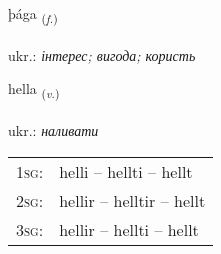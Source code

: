 \documentclass[frontgrid, backgrid]{flacards}\usepackage[]{graphicx}\usepackage[]{xcolor}
\begin{document}
\renewcommand{\flhead}{\vskip5pt \fboxsep=0pt {\small\bfseries\footnotesize Nafnorð | іменник}}
\renewcommand{\fcfoot}{\vskip5pt \fboxsep=0pt \hspace{2pt}{\small\bfseries\footnotesize 2K}}

\renewcommand{\blhead}{\vskip5pt {\small\bfseries\footnotesize Nafnorð | іменник }}
\renewcommand{\bcfoot}{\vskip5pt \hspace{2pt}{\small\bfseries\footnotesize 2K}}


{þága \small{\textsubscript{(\textit{f.})}} \\[1ex] %
\textphonetic{[θauːɣa]} \\
ukr.: \emph{інтерес; вигода; користь} \\  [2ex]
\renewcommand*{\arraystretch}{0.8}
}

\renewcommand{\flhead}{\vskip5pt \fboxsep=0pt {\small\bfseries\footnotesize Sagnorð | дієслово}}
\renewcommand{\fcfoot}{\vskip5pt \fboxsep=0pt \hspace{2pt}{\small\bfseries\footnotesize 2K}}

\renewcommand{\blhead}{\vskip5pt {\small\bfseries\footnotesize Sagnorð | дієслово }}
\renewcommand{\bcfoot}{\vskip5pt \hspace{2pt}{\small\bfseries\footnotesize 2K}}


{hella \small{\textsubscript{(\textit{v.})}} \\[1ex] %
\textphonetic{[hɛtla]} \\
ukr.: \emph{наливати} \\  [2ex]
\renewcommand*{\arraystretch}{0.8}
\begin{tabular}{p{1cm}l}
\textsc{1sg}: & helli -- hellti -- hellt \\ 
\textsc{2sg}: & hellir -- helltir -- hellt \\ 
\textsc{3sg}: & hellir -- hellti -- hellt \\ 
\end{tabular}
}
\end{document}
